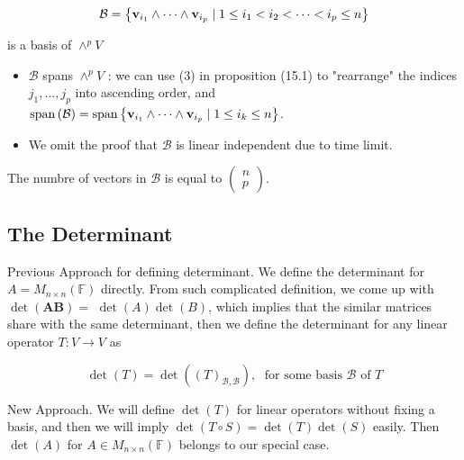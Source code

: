 \documentclass[11pt]{article}
\begin{document}
\[
\mathcal{B} = \left\{  {{\bf v}_{{i}_1} \land  \cdots  \land  {\bf v}_{{i}_{p}} \mid  1 \leq  {i}_1 < {i}_2 < \cdots  < {i}_{p} \leq  n}\right\}
\]

is a basis of \({ \land  }^{p}V\)

\begin{itemize}
\item \(\mathcal{B}\) spans \({ \land  }^{p}V\) : we can use (3) in proposition (15.1) to "rearrange" the indices \({j}_1,\ldots ,{j}_{p}\) into ascending order, and \(\operatorname{span}\left( \mathcal{B}\right)  = \operatorname{span}\left\{  {{\bf v}_{{i}_1} \land  \cdots  \land  {\bf v}_{{i}_{p}} \mid  1 \leq  {i}_{k} \leq  n}\right\}\).
\end{itemize}

\begin{itemize}
\item We omit the proof that \(\mathcal{B}\) is linear independent due to time limit.
\end{itemize}

The numbre of vectors in \(\mathcal{B}\) is equal to \(\left( \begin{array}{l} n \\  p \end{array}\right)\).

\subsection{The Determinant}

Previous Approach for defining determinant. We define the determinant for \(A = {M}_{n \times  n}\left( \mathbb{F}\right)\) directly. From such complicated definition, we come up with \(\det \left( \mathbf{{AB}}\right)  =\)  \(\det \left( A\right) \det \left( B\right)\), which implies that the similar matrices share with the same determinant, then we define the determinant for any linear operator \(T : V \rightarrow  V\) as

\[
\det \left( T\right)  = \det \left( {\left( T\right) }_{\mathcal{B},\mathcal{B}}\right) ,\;\text{ for some basis }\mathcal{B}\text{ of }T
\]

New Approach. We will define \(\det \left( T\right)\) for linear operators without fixing a basis, and then we will imply \(\det \left( {T \circ  S}\right)  = \det \left( T\right) \det \left( S\right)\) easily. Then \(\det \left( A\right)\) for \(A \in  {M}_{n \times  n}\left( \mathbb{F}\right)\) belongs to our special case.
\end{document}
